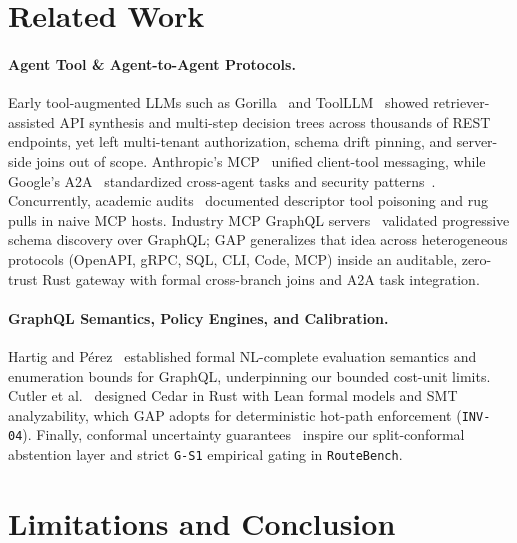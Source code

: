 \documentclass[10pt,twocolumn]{article}
\begin{document}
\section{Related Work}
\label{sec:related}

\paragraph{Agent Tool \& Agent-to-Agent Protocols.}
Early tool-augmented LLMs such as Gorilla~\cite{patil2023gorilla} and ToolLLM~\cite{qin2023toolllm} showed retriever-assisted API synthesis and multi-step decision trees across thousands of REST endpoints, yet left multi-tenant authorization, schema drift pinning, and server-side joins out of scope. Anthropic's MCP~\cite{anthropic2024mcp} unified client-tool messaging, while Google's A2A~\cite{google2025a2a} standardized cross-agent tasks and security patterns~\cite{arxiv2504_16902}. Concurrently, academic audits~\cite{song2025beyond,wang2025mcptox,arxiv2512_06556} documented descriptor tool poisoning and rug pulls in naive MCP hosts. Industry MCP GraphQL servers~\cite{apollo_mcp_grafbase} validated progressive schema discovery over GraphQL; GAP generalizes that idea across heterogeneous protocols (OpenAPI, gRPC, SQL, CLI, Code, MCP) inside an auditable, zero-trust Rust gateway with formal cross-branch joins and A2A task integration.

\paragraph{GraphQL Semantics, Policy Engines, and Calibration.}
Hartig and P\'erez~\cite{hartig2018graphql} established formal NL-complete evaluation semantics and enumeration bounds for GraphQL, underpinning our bounded cost-unit limits. Cutler et al.~\cite{cutler2024cedar} designed Cedar in Rust with Lean formal models and SMT analyzability, which GAP adopts for deterministic hot-path enforcement (\texttt{INV-04}). Finally, conformal uncertainty guarantees~\cite{angelopoulos2021conformal} inspire our split-conformal abstention layer and strict \texttt{G-S1} empirical gating in \texttt{RouteBench}.

\section{Limitations and Conclusion}
\label{sec:conclusion}
\end{document}

